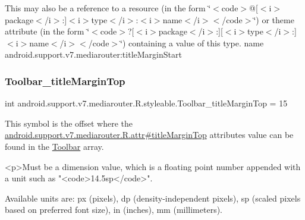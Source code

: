 This may also be a reference to a resource (in the form \char`\"{}$<$code$>$@\mbox{[}$<$i$>$package$<$/i$>$\+:\mbox{]}$<$i$>$type$<$/i$>$\+:$<$i$>$name$<$/i$>$$<$/code$>$\char`\"{}) or theme attribute (in the form \char`\"{}$<$code$>$?\mbox{[}$<$i$>$package$<$/i$>$\+:\mbox{]}\mbox{[}$<$i$>$type$<$/i$>$\+:\mbox{]}$<$i$>$name$<$/i$>$$<$/code$>$\char`\"{}) containing a value of this type.  name android.\+support.\+v7.\+mediarouter\+:title\+Margin\+Start \mbox{\label{classandroid_1_1support_1_1v7_1_1mediarouter_1_1R_1_1styleable_aac05bd7aeaa312a603d361f90aa05b12}} 
\subsubsection{\texorpdfstring{Toolbar\+\_\+title\+Margin\+Top}{Toolbar\_titleMarginTop}}
{\footnotesize\ttfamily int android.\+support.\+v7.\+mediarouter.\+R.\+styleable.\+Toolbar\+\_\+title\+Margin\+Top = 15\hspace{0.3cm}{\ttfamily [static]}}

This symbol is the offset where the \hyperlink{classandroid_1_1support_1_1v7_1_1mediarouter_1_1R_1_1attr_a5bb3e1cd77d6b3ef36342df2fc7f7a4b}{android.\+support.\+v7.\+mediarouter.\+R.\+attr\#title\+Margin\+Top} attribute\textquotesingle{}s value can be found in the \hyperlink{classandroid_1_1support_1_1v7_1_1mediarouter_1_1R_1_1styleable_a6815cdfaadde30c82b955863af196899}{Toolbar} array.

\begin{DoxyVerb}      <p>Must be a dimension value, which is a floating point number appended with a unit such as "<code>14.5sp</code>".
\end{DoxyVerb}
 Available units are\+: px (pixels), dp (density-\/independent pixels), sp (scaled pixels based on preferred font size), in (inches), mm (millimeters). 

